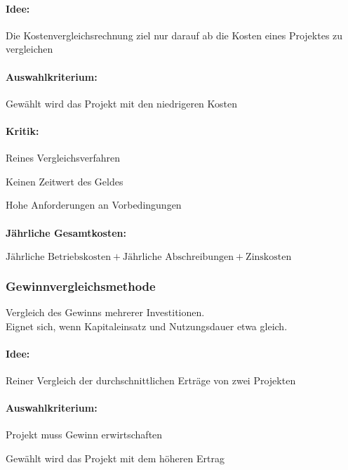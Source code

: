 \paragraph{Idee:} Die Kostenvergleichsrechnung ziel nur darauf ab die Kosten eines Projektes zu vergleichen

\paragraph{Auswahlkriterium:} Gewählt wird das Projekt mit den niedrigeren Kosten

\paragraph{Kritik:}
\begin{compactitem}
	\item Reines Vergleichsverfahren
	\item Keinen Zeitwert des Geldes
	\item Hohe Anforderungen an Vorbedingungen
\end{compactitem}

\paragraph{Jährliche Gesamtkosten:} $\text{Jährliche Betriebskosten} + \text{Jährliche Abschreibungen} + \text{Zinskosten}$

\clearpage
\subsubsection{Gewinnvergleichsmethode}
Vergleich des Gewinns mehrerer Investitionen.\\
Eignet sich, wenn Kapitaleinsatz und Nutzungsdauer etwa gleich.

\paragraph{Idee:} Reiner Vergleich der durchschnittlichen Erträge von zwei Projekten

\paragraph{Auswahlkriterium:}
\begin{compactitem}
	\item Projekt muss Gewinn erwirtschaften
	\item Gewählt wird das Projekt mit dem höheren Ertrag
\end{compactitem}

